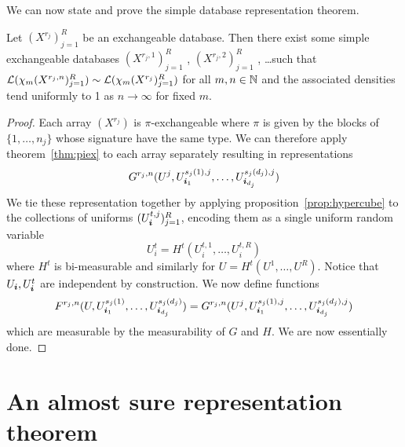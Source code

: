 We can now state and prove the simple database representation theorem.

\begin{thm}
  \label{thm:simple-database}
  Let $(X^{r_j})_{j=1}^R$ be an exchangeable database.
  Then there exist some simple exchangeable databases $(X^{r_j,1})_{j=1}^R$ , $(X^{r_j,2})_{j=1}^R$ , \dots such that
  $\mathcal{L}(\chi_m (X^{r_j,n})_{j=1}^R) \sim \mathcal{L}(\chi_m (X^{r_j})_{j=1}^R)$ for all $m,n \in \mathbb{N}$ and the associated densities tend
  uniformly to 1 as $n \to \infty$ for fixed $m$.
\end{thm}

\begin{proof}
  Each array $(X^{r_j})$ is $\pi$-exchangeable where $\pi$ is given by the blocks of $\{1,\dots,n_j\}$ whose signature have the same type.
  We can therefore apply theorem~\ref{thm:piex} to each array separately resulting in representations
\begin{equation}
  G^{r_j,n}(U^j,U^{s_{j}(1),j}_{\bm{i}_1},\dots,U^{s_{j}(d_j),j}_{\bm{i}_{d_j}})
\end{equation}
We tie these representation together by applying proposition~\ref{prop:hypercube} to the collections of uniforms $(U^{t,j}_{\bm{i}})_{j=1}^R$, encoding them as a single uniform random variable
\begin{equation}
  U^t_{i} = H^t(U^{t,1}_{i},\dots,U^{t,R}_{i})
\end{equation}
where $H^t$ is bi-measurable and similarly for $U = H^t(U^{1},\dots,U^{R})$.
Notice that $U_{\bm{i}}, U^t_{\bm{i}}$ are independent by construction.
We now define functions
\begin{equation}
F^{r_j,n}(U,U^{s_{j}(1)}_{\bm{i}_1},\dots,U^{s_{j}(d_j)}_{\bm{i}_{d_j}}) = G^{r_j,n}(U^j,U^{s_{j}(1),j}_{\bm{i}_1},\dots,U^{s_{j}(d_j),j}_{\bm{i}_{d_j}})
\end{equation}
which are measurable by the measurability of $G$ and $H$.
We are now essentially done.
\end{proof}

\begin{rem}
\label{rem:randfunc}
\end{rem}

\section{An almost sure representation theorem}
\label{sec:almost_sure}

